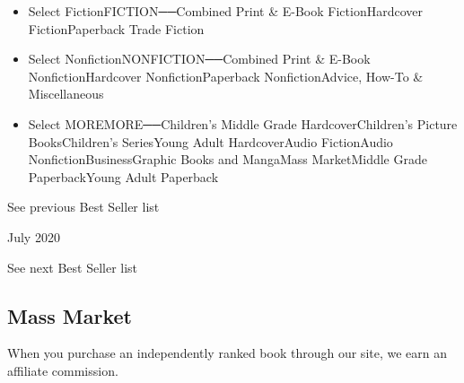 \begin{itemize}
\tightlist
\item
  Select FictionFICTION──Combined Print \& E-Book FictionHardcover
  FictionPaperback Trade Fiction
\item
  Select NonfictionNONFICTION──Combined Print \& E-Book
  NonfictionHardcover NonfictionPaperback NonfictionAdvice, How-To \&
  Miscellaneous
\item
  Select MOREMORE──Children's Middle Grade HardcoverChildren's Picture
  BooksChildren's SeriesYoung Adult HardcoverAudio FictionAudio
  NonfictionBusinessGraphic Books and MangaMass MarketMiddle Grade
  PaperbackYoung Adult Paperback
\end{itemize}

\href{/books/best-sellers/2020/06/01/mass-market-monthly/}{}

See previous Best Seller list

July 2020

See next Best Seller list

\hypertarget{mass-market}{%
\subsection{Mass Market}\label{mass-market}}

When you purchase an independently ranked book through our site, we earn
an affiliate commission.

